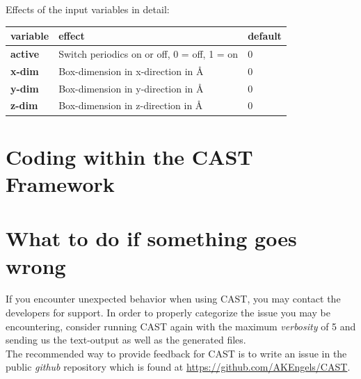 \documentclass[10pt,a4paper]{article} %
\begin{document}
	Effects of the input variables in detail:
	\begin{longtable}{|p{3cm}|p{6.5cm}|p{1.5cm}|}
		\textbf{variable} & effect & default \\
		\hline
		\textbf{active} & Switch periodics on or off, 0 = off, 1 = on & 0 \\
		\textbf{x-dim} & Box-dimension in x-direction in \AA & 0 \\
		\textbf{y-dim} & Box-dimension in y-direction in \AA & 0 \\
		\textbf{z-dim} & Box-dimension in z-direction in \AA & 0 \\
	\end{longtable}


	\newpage
	\section{Coding within the CAST Framework}



	\newpage
	\section{What to do if something goes wrong}
	If you encounter unexpected behavior when using \ac{CAST}, you may contact the developers for support. In order to properly categorize the issue you may be encountering, consider running \ac{CAST} again with the maximum \textit{verbosity} of 5 and sending us the text-output as well as the generated files. \\

    The recommended way to provide feedback for CAST is to write an issue in the public \textit{github} repository which is found at \url{https://github.com/AKEngels/CAST}.
    

	\newpage
\end{document}
